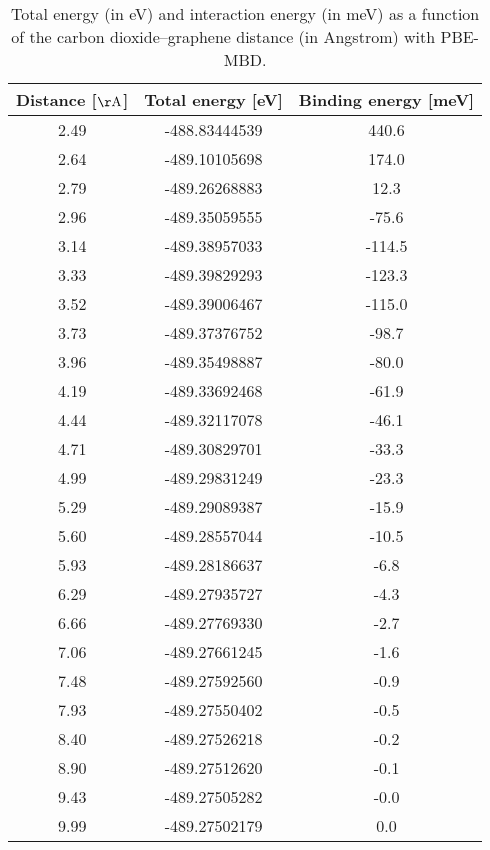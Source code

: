\begin{table}[h]
\centering
\begin{tabular}{ccc}
\hline
Distance [$\mathrm{\AA}$] & Total energy [eV] & Binding energy [meV] \\
\hline
2.49 & -488.83444539 & 440.6 \\
2.64 & -489.10105698 & 174.0 \\
2.79 & -489.26268883 & 12.3 \\
2.96 & -489.35059555 & -75.6 \\
3.14 & -489.38957033 & -114.5 \\
3.33 & -489.39829293 & -123.3 \\
3.52 & -489.39006467 & -115.0 \\
3.73 & -489.37376752 & -98.7 \\
3.96 & -489.35498887 & -80.0 \\
4.19 & -489.33692468 & -61.9 \\
4.44 & -489.32117078 & -46.1 \\
4.71 & -489.30829701 & -33.3 \\
4.99 & -489.29831249 & -23.3 \\
5.29 & -489.29089387 & -15.9 \\
5.60 & -489.28557044 & -10.5 \\
5.93 & -489.28186637 & -6.8 \\
6.29 & -489.27935727 & -4.3 \\
6.66 & -489.27769330 & -2.7 \\
7.06 & -489.27661245 & -1.6 \\
7.48 & -489.27592560 & -0.9 \\
7.93 & -489.27550402 & -0.5 \\
8.40 & -489.27526218 & -0.2 \\
8.90 & -489.27512620 & -0.1 \\
9.43 & -489.27505282 & -0.0 \\
9.99 & -489.27502179 & 0.0 \\
\hline
\end{tabular}
\caption{Total energy (in eV) and interaction energy (in meV) as a function of the carbon dioxide--graphene distance (in Angstrom) with PBE-MBD.}
\label{SI_dft_table_PBE-MBD}
\end{table}
